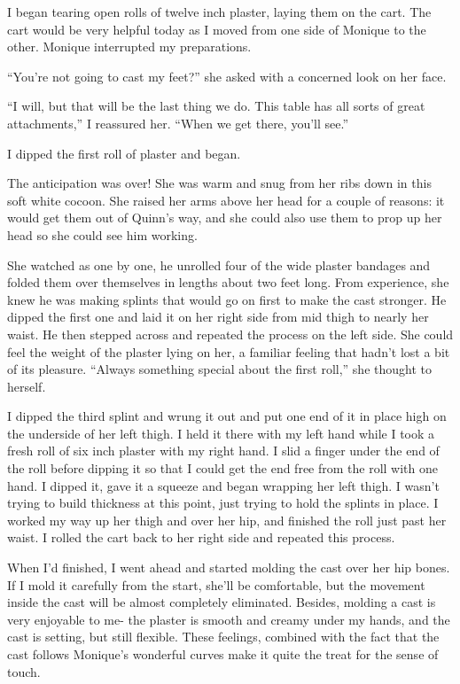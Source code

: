 I began tearing open rolls of twelve inch plaster, laying them on the cart. The cart would
be very helpful today as I moved from one side of Monique to the other. Monique interrupted my
preparations.

``You're not going to cast my feet?'' she asked with a concerned look on her face.

``I will, but that will be the last thing we do. This table has all sorts of great
attachments,'' I reassured her. ``When we get there, you'll see.''

I dipped the first roll of plaster and began.

\begin{thought}
The anticipation was over! She was warm and snug from her ribs down in this soft white
cocoon. She raised her arms above her head for a couple of reasons: it would get them out of
Quinn's way, and she could also use them to prop up her head so she could see him working.

She watched as one by one, he unrolled four of the wide plaster bandages and folded them
over themselves in lengths about two feet long. From experience, she knew he was making splints
that would go on first to make the cast stronger. He dipped the first one and laid it on her
right side from mid thigh to nearly her waist. He then stepped across and repeated the process
on the left side. She could feel the weight of the plaster lying on her, a familiar feeling that
hadn't lost a bit of its pleasure. ``Always something special about the first roll,'' she
thought
to herself.
\end{thought}

I dipped the third splint and wrung it out and put one end of it in place high on the
underside of her left thigh. I held it there with my left hand while I took a fresh roll of six
inch plaster with my right hand. I slid a finger under the end of the roll before dipping it so
that I could get the end free from the roll with one hand. I dipped it, gave it a squeeze and
began wrapping her left thigh. I wasn't trying to build thickness at this point, just trying to
hold the splints in place. I worked my way up her thigh and over her hip, and finished the roll
just past her waist. I rolled the cart back to her right side and repeated this process.

When I'd finished, I went ahead and started molding the cast over her hip bones. If I mold
it carefully from the start, she'll be comfortable, but the movement inside the cast will be
almost completely eliminated. Besides, molding a cast is very enjoyable to me- the plaster is
smooth and creamy under my hands, and the cast is setting, but still flexible. These feelings,
combined with the fact that the cast follows Monique's wonderful curves make it quite the treat
for the sense of touch.

